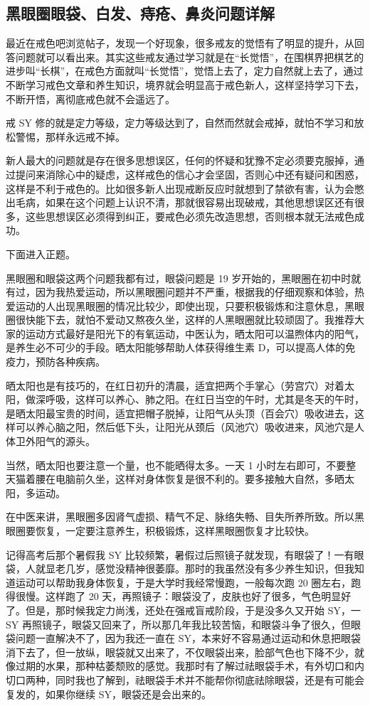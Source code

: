 \documentclass[fontset=founder]{ctexart}
\begin{document}
\subsection{黑眼圈眼袋、白发、痔疮、鼻炎问题详解}

最近在戒色吧浏览帖子，发现一个好现象，很多戒友的觉悟有了明显的提升，从回答问题就可以看出来。其实这些戒友通过学习就是在“长觉悟”，在围棋界把棋艺的进步叫“长棋”，在戒色方面就叫“长觉悟”，觉悟上去了，定力自然就上去了，通过不断学习戒色文章和养生知识，境界就会明显高于戒色新人，这样坚持学习下去，不断开悟，离彻底戒色就不会遥远了。

戒 SY 修的就是定力等级，定力等级达到了，自然而然就会戒掉，就怕不学习和放松警惕，那样永远戒不掉。

新人最大的问题就是存在很多思想误区，任何的怀疑和犹豫不定必须要克服掉，通过提问来消除心中的疑虑，这样戒色的信心才会坚固，否则心中还有疑问和困惑，这样是不利于戒色的。比如很多新人出现戒断反应时就想到了禁欲有害，认为会憋出毛病，如果在这个问题上认识不清，那就很容易出现破戒，其他思想误区还有很多，这些思想误区必须得到纠正，要戒色必须先改造思想，否则根本就无法戒色成功。

下面进入正题。

黑眼圈和眼袋这两个问题我都有过，眼袋问题是 19 岁开始的，黑眼圈在初中时就有过，因为我热爱运动，所以黑眼圈问题并不严重，根据我的仔细观察和体验，热爱运动的人出现黑眼圈的情况比较少，即使出现，只要积极锻炼和注意休息，黑眼圈很快能下去，就怕不爱动又熬夜久坐，这样的人黑眼圈就比较顽固了。我推荐大家的运动方式最好是阳光下的有氧运动，中医认为，晒太阳可以温煦体内的阳气，是养生必不可少的手段。晒太阳能够帮助人体获得维生素 D，可以提高人体的免疫力，预防各种疾病。

晒太阳也是有技巧的，在红日初升的清晨，适宜把两个手掌心（劳宫穴）对着太阳，做深呼吸，这样可以养心、肺之阳。在红日当空的午时，尤其是冬天的午时，是晒太阳最宝贵的时间，适宜把帽子脱掉，让阳气从头顶（百会穴）吸收进去，这样可以养心脑之阳，然后低下头，让阳光从颈后（风池穴）吸收进来，风池穴是人体卫外阳气的源头。

当然，晒太阳也要注意一个量，也不能晒得太多。一天 1 小时左右即可，不要整天猫着腰在电脑前久坐，这样对身体恢复是很不利的。要多接触大自然，多晒太阳，多运动。

在中医来讲，黑眼圈多因肾气虚损、精气不足、脉络失畅、目失所养所致。所以黑眼圈要恢复，一定要注意养生，积极锻炼，这样黑眼圈恢复才比较快。

记得高考后那个暑假我 SY 比较频繁，暑假过后照镜子就发现，有眼袋了！一有眼袋，人就显老几岁，感觉没精神很萎靡。那时的我虽然没有多少养生知识，但我知道运动可以帮助我身体恢复，于是大学时我经常慢跑，一般每次跑 20 圈左右，跑得很慢。这样跑了 20 天，再照镜子：眼袋没了，皮肤也好了很多，气色明显好了。但是，那时候我定力尚浅，还处在强戒盲戒阶段，于是没多久又开始 SY，一 SY 再照镜子，眼袋又回来了，所以那几年我比较苦恼，和眼袋斗争了很久，但眼袋问题一直解决不了，因为我还一直在 SY，本来好不容易通过运动和休息把眼袋消下去了，但一放纵，眼袋就又出来了，不仅眼袋出来，脸部气色也下降不少，就像过期的水果，那种枯萎颓败的感觉。我那时有了解过祛眼袋手术，有外切口和内切口两种，同时我也了解到，祛眼袋手术并不能帮你彻底祛除眼袋，还是有可能会复发的，如果你继续 SY，眼袋还是会出来的。
\end{document}
